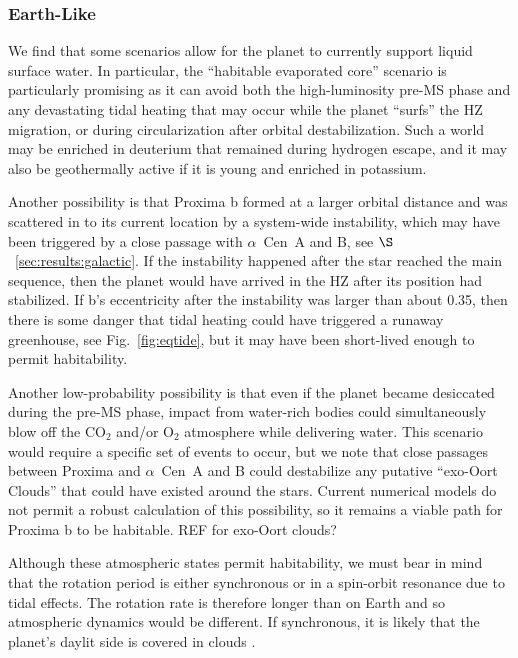 \documentclass[preprint,12pt]{aastex}
\newcommand{\xxx}[1]{{\color{red} #1}} %
\def\acen{{$\alpha$~Cen}}
\begin{document}
\subsubsection{Earth-Like}
\label{sec:results:atmstates:earthlike}

We find that some scenarios allow for the planet to currently support liquid
surface water. In particular, the ``habitable evaporated core'' scenario
\citep{Luger15} is particularly promising as it can avoid both the
high-luminosity pre-MS phase and any devastating tidal
heating that may occur while the planet ``surfs'' the HZ migration, or
during circularization after orbital destabilization. Such a world may
be enriched in deuterium that remained during \xxx{hydrogen} escape, and it
may also be geothermally active if it is young and enriched in
potassium.

Another possibility is that Proxima b formed at a larger orbital
distance and was scattered in to its current location by a system-wide
instability, which may have been triggered by a close passage with
\acen~A and B, see $\S$~\ref{sec:results:galactic}. If the instability
happened after the star reached the main sequence, then the planet
would have arrived in the HZ after its position had stabilized. If b's
eccentricity after the instability was larger than about 0.35, then
there is some danger that tidal heating could have triggered a runaway
greenhouse, \xxx{see Fig.~\ref{fig:eqtide}}, but it may have been
short-lived enough to permit habitability.

Another low-probability possibility is that even if the planet became
desiccated during the pre-MS phase, impact from water-rich bodies
could simultaneously blow off the CO$_2$ and/or O$_2$ atmosphere while
delivering water. This scenario would require a specific set of events to occur, but we note
that close passages between Proxima and \acen~A and B could destabilize
any putative ``exo-Oort Clouds'' that could have existed around the
stars. Current numerical models do not permit a robust calculation of
this possibility, so it remains a viable path for Proxima b to be
habitable. \xxx{REF for exo-Oort clouds?}

Although these atmospheric states permit habitability, we must bear in
mind that the rotation period is either synchronous or in a spin-orbit
resonance due to tidal effects. The rotation rate is therefore longer
than on Earth and so atmospheric dynamics would be different. If
synchronous, it is likely that the planet's daylit side is
covered in clouds \citep{Yang13}.
\end{document}
